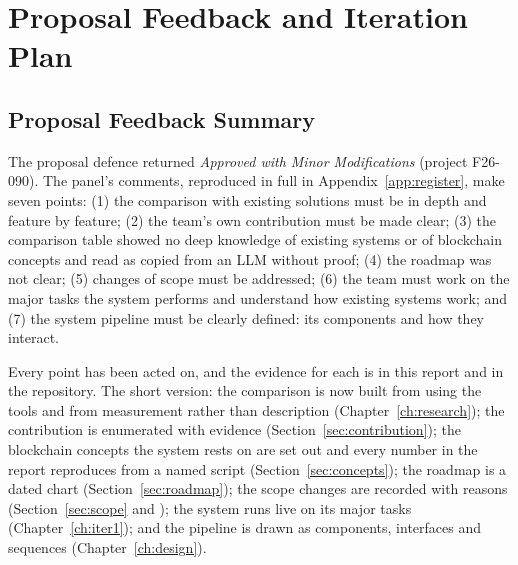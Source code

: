 \chapter{Proposal Feedback and Iteration Plan}

\section{Proposal Feedback Summary}
The proposal defence returned \emph{Approved with Minor Modifications} (project F26-090). The panel's comments, reproduced in full in Appendix~\ref{app:register}, make seven points: (1) the comparison with existing solutions must be in depth and feature by feature; (2) the team's own contribution must be made clear; (3) the comparison table showed no deep knowledge of existing systems or of blockchain concepts and read as copied from an LLM without proof; (4) the roadmap was not clear; (5) changes of scope must be addressed; (6) the team must work on the major tasks the system performs and understand how existing systems work; and (7) the system pipeline must be clearly defined: its components and how they interact.

Every point has been acted on, and the evidence for each is in this report and in the repository. The short version: the comparison is now built from using the tools and from measurement rather than description (Chapter~\ref{ch:research}); the contribution is enumerated with evidence (Section~\ref{sec:contribution}); the blockchain concepts the system rests on are set out and every number in the report reproduces from a named script (Section~\ref{sec:concepts}); the roadmap is a dated chart (Section~\ref{sec:roadmap}); the scope changes are recorded with reasons (Section~\ref{sec:scope} and ); the system runs live on its major tasks (Chapter~\ref{ch:iter1}); and the pipeline is drawn as components, interfaces and sequences (Chapter~\ref{ch:design}).

